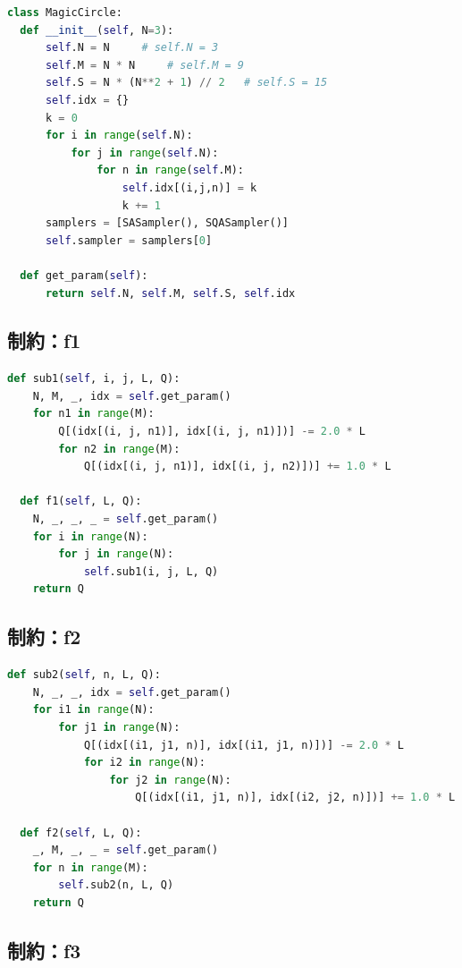 \documentclass[uplatex,dvipdfmx,a4paper,11pt,oneside,openany]{jsbook}
\begin{document}
\begin{lstlisting}[language=Python]
class MagicCircle:
  def __init__(self, N=3):
      self.N = N     # self.N = 3
      self.M = N * N     # self.M = 9
      self.S = N * (N**2 + 1) // 2   # self.S = 15
      self.idx = {}
      k = 0
      for i in range(self.N):
          for j in range(self.N):
              for n in range(self.M):
                  self.idx[(i,j,n)] = k
                  k += 1
      samplers = [SASampler(), SQASampler()]
      self.sampler = samplers[0]

  def get_param(self):
      return self.N, self.M, self.S, self.idx
\end{lstlisting}


\subsection{制約：f1}

\begin{lstlisting}[language=Python]
  def sub1(self, i, j, L, Q):
    N, M, _, idx = self.get_param()
    for n1 in range(M):
        Q[(idx[(i, j, n1)], idx[(i, j, n1)])] -= 2.0 * L
        for n2 in range(M):
            Q[(idx[(i, j, n1)], idx[(i, j, n2)])] += 1.0 * L

  def f1(self, L, Q):
    N, _, _, _ = self.get_param()
    for i in range(N):
        for j in range(N):
            self.sub1(i, j, L, Q)
    return Q
\end{lstlisting}


\subsection{制約：f2}

\begin{lstlisting}[language=Python]
  def sub2(self, n, L, Q):
    N, _, _, idx = self.get_param()
    for i1 in range(N):
        for j1 in range(N):
            Q[(idx[(i1, j1, n)], idx[(i1, j1, n)])] -= 2.0 * L
            for i2 in range(N):
                for j2 in range(N):
                    Q[(idx[(i1, j1, n)], idx[(i2, j2, n)])] += 1.0 * L

  def f2(self, L, Q):
    _, M, _, _ = self.get_param()
    for n in range(M):
        self.sub2(n, L, Q)
    return Q
\end{lstlisting}

\subsection{制約：f3}
\end{document}
